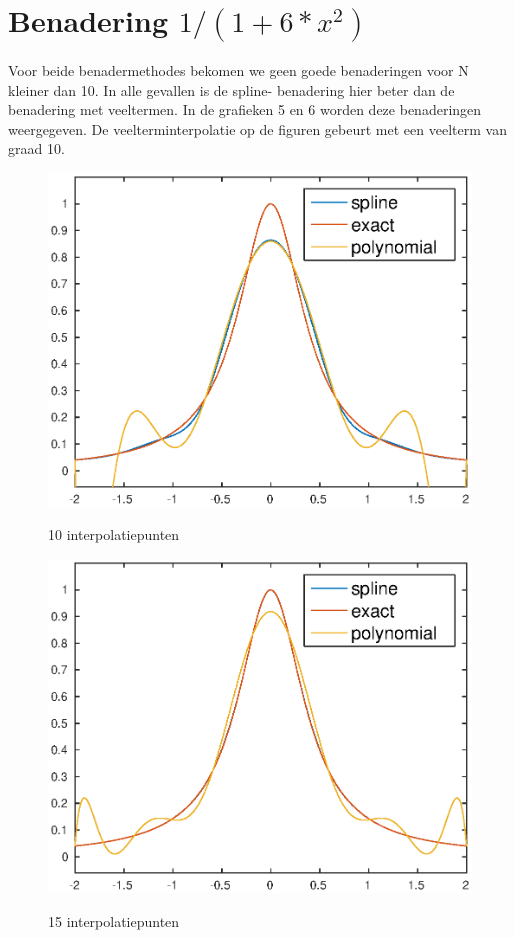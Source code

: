 \documentclass[]{article}
\begin{document}
\pagebreak

\section*{Benadering $1/(1+6*x^2)$}
Voor beide benadermethodes bekomen we geen goede benaderingen voor N kleiner dan 10. In alle gevallen is de spline- benadering hier beter dan de benadering met veeltermen.
In de grafieken 5 en 6 worden deze benaderingen weergegeven. De veelterminterpolatie op de figuren gebeurt met een veelterm van graad 10. 
\begin{figure}[H]
\centering
\begin{minipage}{0.5\textwidth}
\centering %
 \includegraphics[width=1\textwidth]{opgave2b_N10.eps}
 \label{opgave2b_N10}
\caption{10 interpolatiepunten}
\end{minipage}\hfill
\begin{minipage}{0.5\textwidth}
\centering
\includegraphics[width=1\textwidth]{opgave2b_N15.eps}
 \label{opgave2b_N15.eps}
\caption{15 interpolatiepunten}
\end{minipage}
\end{figure}
\end{document}
